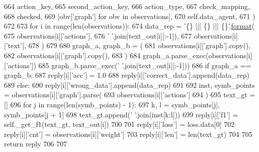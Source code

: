 \begin{DoxyCode}
664                 action\_key,
665                 second\_action\_key,
666                 action\_type,
667                 check\_mapping,
668                 checked,
669                 [obv[\textcolor{stringliteral}{'graph'}] \textcolor{keywordflow}{for} obv \textcolor{keywordflow}{in} observations],
670                 self.data\_agent,
671             )
672 
673             \textcolor{keywordflow}{for} i \textcolor{keywordflow}{in} range(len(observations)):
674                 data\_rep = \textcolor{stringliteral}{'\{\} ||| \{\} ||| \{\}'}.\hyperlink{namespaceparlai_1_1chat__service_1_1services_1_1messenger_1_1shared__utils_a32e2e2022b824fbaf80c747160b52a76}{format}(
675                     observations[i][\textcolor{stringliteral}{'actions'}],
676                     \textcolor{stringliteral}{' '}.join(text\_out[i][:-1]),
677                     observations[i][\textcolor{stringliteral}{'text'}],
678                 )
679 
680                 graph\_a, graph\_b = (
681                     observations[i][\textcolor{stringliteral}{'graph'}].copy(),
682                     observations[i][\textcolor{stringliteral}{'graph'}].copy(),
683                 )
684                 graph\_a.parse\_exec(observations[i][\textcolor{stringliteral}{'actions'}])
685                 graph\_b.parse\_exec(\textcolor{stringliteral}{' '}.join(text\_out[i][:-1]))
686                 \textcolor{keywordflow}{if} graph\_a == graph\_b:
687                     reply[i][\textcolor{stringliteral}{'acc'}] = 1.0
688                     reply[i][\textcolor{stringliteral}{'correct\_data'}].append(data\_rep)
689                 \textcolor{keywordflow}{else}:
690                     reply[i][\textcolor{stringliteral}{'wrong\_data'}].append(data\_rep)
691 
692                 inst, symb\_points = observations[i][\textcolor{stringliteral}{'graph'}].parse(
693                     observations[i][\textcolor{stringliteral}{'actions'}]
694                 )
695                 text\_gt = []
696                 \textcolor{keywordflow}{for} j \textcolor{keywordflow}{in} range(len(symb\_points) - 1):
697                     k, l = symb\_points[j], symb\_points[j + 1]
698                     text\_gt.append(\textcolor{stringliteral}{' '}.join(inst[k:l]))
699                 reply[i][\textcolor{stringliteral}{'f1'}] = self.\_get\_f1(text\_gt, text\_out[i])
700 
701                 reply[i][\textcolor{stringliteral}{'loss'}] = loss.data[0]
702                 reply[i][\textcolor{stringliteral}{'cnt'}] = observations[i][\textcolor{stringliteral}{'weight'}]
703                 reply[i][\textcolor{stringliteral}{'len'}] = len(text\_gt)
704 
705             \textcolor{keywordflow}{return} reply
706 
707 
\end{DoxyCode}


